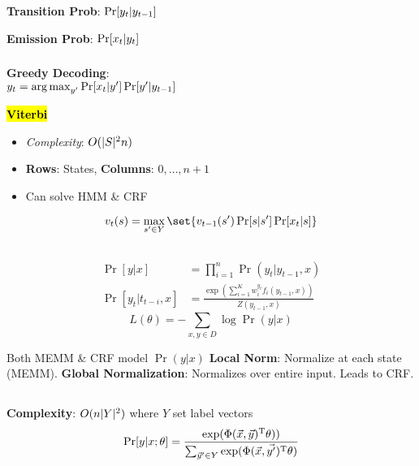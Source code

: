 \documentclass[8pt]{extarticle}
\renewcommand{\green}[1]{{\color{ForestGreen} #1}}
\newcommand{\greenbf}[1]{\textbf{\green{#1}}}
\newcommand{\redbf}[1]{\textbf{\red{#1}}}
\begin{document}
\begin{multicols}{3}
  \greenbf{Transition Prob}: $\Pr\lbrack y_{t} \vert y_{t-1}\rbrack$

  \greenbf{Emission Prob}: $\Pr\lbrack x_{t} \vert y_{t}\rbrack$

  \subsubsection*{}

  \greenbf{Greedy Decoding}: \\${y_t = \operatorname*{arg\,max}_{y'} \Pr[x_t \vert y'] \Pr[y' \vert y_{t-1}]}$

  \greenbf{\hl{Viterbi}}
  \begin{itemize}
    \item \textit{Complexity}: $O(\lvert S\rvert^{2} n)$
    \item \textbf{Rows}: States, \textbf{Columns}: ${0,\ldots,n+1}$
    \item Can solve HMM \& CRF
  \end{itemize}

  \begin{equation*}
    v_{t}(s) = \max_{s' \in Y}\set{v_{t-1}(s') \Pr[s \vert s'] \Pr[x_t \vert s]}
  \end{equation*}

  \subsection*{}
  \begin{align*}
    \Pr[y\vert x] &= \prod_{i=1}^{n} \Pr(y_t \vert y_{t-1},x) \\
    \Pr[y_{t} \vert t_{t-i}, x] &= \frac{\exp\left(\sum_{i=1}^{K}w_{i}^{y_t}f_{i}(y_{t-1},x) \right)}{Z(y_{t-1},x)}
  \end{align*}
  \begin{equation*}
    L(\theta) = -\sum_{x,y\in D} \log \Pr(y \vert x)
  \end{equation*}

  Both MEMM \& CRF model $\Pr(y\vert x)$
  \greenbf{Local Norm}: Normalize at each state (MEMM). \redbf{Label bias} \greenbf{Global Normalization}: Normalizes over entire input. Leads to CRF\@.

  \subsection*{}
  \textbf{Complexity}: $O(n\lvert Y\rvert^{2})$ where $Y$ set label vectors
  \begin{equation*}
    \Pr[y \vert x; \theta] = \frac{\exp(\Phi(\vec{x},\vec{y})^{\text{T}}\theta))}{\sum_{\vec{y}' \in Y} \exp(\Phi(\vec{x}, \vec{y'})^{\text{T}}\theta)}
  \end{equation*}


\end{multicols}
\end{document}
